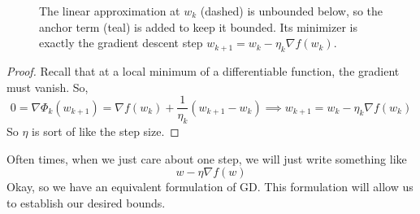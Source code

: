 \begin{lemma}
\begin{figure}[H]
			\caption{The linear approximation at $w_k$ (dashed) is unbounded below, so the anchor term (teal) is added to keep it bounded. Its minimizer is exactly the gradient descent step $w_{k+1} = w_k - \eta_k \nabla f(w_k)$.}
		\end{figure}
	\end{lemma}
	\begin{proof}
		Recall that at a local minimum of a differentiable function, the gradient must vanish. So, 
		\begin{equation}
			0 = \nabla \Phi_k (w_{k+1}) = \nabla f(w_k) + \frac{1}{\eta_k}(w_{k+1} - w_k) \implies w_{k+1} = w_k - \eta_k \nabla f(w_k)
		\end{equation}
		So $\eta$ is sort of like the step size. 
	\end{proof}

	Often times, when we just care about one step, we will just write something like 
	\begin{equation}
	  w - \eta \nabla f(w) 
	\end{equation}
	Okay, so we have an equivalent formulation of GD. This formulation will allow us to establish our desired bounds. 

